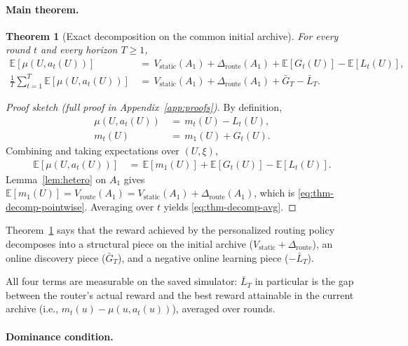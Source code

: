 \documentclass{article} %
\newtheorem{theorem}{Theorem}
\providecommand{\E}{\mathbb{E}}
\begin{document}
\paragraph{Main theorem.}

\label{sec:method-thm-decomp}

\begin{theorem}[Exact decomposition on the common initial archive]
\label{thm:decomp}
For every round $t$ and every horizon $T \ge 1$,
\begin{align}
\E[\mu(U, a_t(U))]
&\,=\, V_{\mathrm{static}}(A_1) + \Delta_{\mathrm{route}}(A_1) + \E[G_t(U)] - \E[L_t(U)],
\label{eq:thm-decomp-pointwise}\\
\frac{1}{T}\sum_{t=1}^T \E[\mu(U, a_t(U))]
&\,=\, V_{\mathrm{static}}(A_1) + \Delta_{\mathrm{route}}(A_1) + \bar G_T - \bar L_T.
\label{eq:thm-decomp-avg}
\end{align}
\end{theorem}

\begin{proof}[Proof sketch (full proof in Appendix~\ref{app:proofs})]
By definition,
\begin{align*}
\mu(U, a_t(U)) &\,=\, m_t(U) - L_t(U), \\
m_t(U) &\,=\, m_1(U) + G_t(U).
\end{align*}
Combining and taking expectations over $(U,\xi)$,
\begin{align*}
\E[\mu(U, a_t(U))] &\,=\, \E[m_1(U)] + \E[G_t(U)] - \E[L_t(U)].
\end{align*}
Lemma~\ref{lem:hetero} on $A_1$ gives $\E[m_1(U)] = V_{\mathrm{route}}(A_1) = V_{\mathrm{static}}(A_1) + \Delta_{\mathrm{route}}(A_1)$, which is \eqref{eq:thm-decomp-pointwise}. Averaging over $t$ yields \eqref{eq:thm-decomp-avg}.
\end{proof}

Theorem~\ref{thm:decomp} says that the reward achieved by the personalized routing policy decomposes into a structural piece on the initial archive ($V_{\mathrm{static}}+\Delta_{\mathrm{route}}$), an online discovery piece ($\bar G_T$), and a negative online learning piece ($-\bar L_T$).

All four terms are measurable on the saved simulator: $\bar L_T$ in particular is the gap between the router's actual reward and the best reward attainable in the current archive (i.e., $m_t(u) - \mu(u, a_t(u))$), averaged over rounds.

\paragraph{Dominance condition.}
\end{document}
